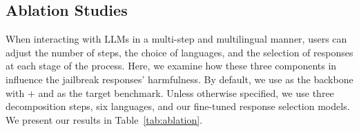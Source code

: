 \vspace{-2mm}
\subsection{Ablation Studies}
\label{sec:ablation_studies}
\vspace{-0.5mm}
When interacting with LLMs in a multi-step and multilingual manner, users can adjust the number of steps, the choice of languages, and the selection of responses at each stage of the process.
Here, we examine how these three components in \speakeasy influence the jailbreak responses'  harmfulness. 
By default, we use \gptfouro as the backbone with \dr $+$ \speakeasy and \harmbench as the target benchmark.
Unless otherwise specified, we use three decomposition steps, six languages, and our fine-tuned response selection models.
We present our results in Table~\ref{tab:ablation}.

